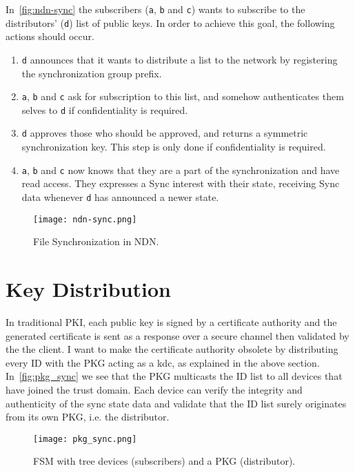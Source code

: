 In~\autoref{fig:ndn-sync} the subscribers (\texttt{a}, \texttt{b} and \texttt{c}) wants to subscribe to the distributors' (\texttt{d}) list of public keys.
In order to achieve this goal, the following actions should occur.
\begin{enumerate}
	\item \texttt{d} announces that it wants to distribute a list to the network by registering the synchronization group prefix. 
	\item \texttt{a}, \texttt{b} and \texttt{c} ask for subscription to this list, and somehow authenticates them selves to \texttt{d} if confidentiality is required.
	\item \texttt{d} approves those who should be approved, and returns a symmetric synchronization key. 
	This step is only done if confidentiality is required.
	\item \texttt{a}, \texttt{b} and \texttt{c} now knows that they are a part of the synchronization and have read access. They expresses a Sync \gls{interest} with their state, receiving Sync \gls{data} whenever \texttt{d} has announced a newer state.
\end{enumerate}

\begin{figure}[ht]
  \centering
  \texttt{[image: ndn-sync.png]}
  \caption[File Synchronization in NDN]{File Synchronization in NDN.}
  \label{fig:ndn-sync}
\end{figure}

\section{Key Distribution}\label{key-distribution}
In traditional \gls{PKI}, each public key is signed by a certificate authority and the generated certificate is sent as a response over a secure channel then validated by the the client.
I want to make the certificate authority obsolete by distributing every \gls{ID} with the \gls{PKG} acting as a \gls{kdc}, as explained in the above section.
In~\autoref{fig:pkg_sync} we see that the \gls{PKG} multicasts the \gls{ID} list to all devices that have joined the trust domain.
Each device can verify the integrity and authenticity of the sync state \gls{data} and validate that the \gls{ID} list surely originates from its own \gls{PKG}, i.e. the distributor.
\begin{figure}[ht]
  \centering
  \texttt{[image: pkg\_sync.png]}
  \caption[File Synchronization Module]{FSM with tree devices (subscribers) and a PKG (distributor).}
  \label{fig:pkg_sync}
\end{figure}



